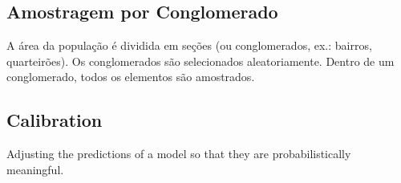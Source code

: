 \subsection{Amostragem por Conglomerado}
A área da população é dividida em seções (ou conglomerados, ex.: bairros, quarteirões). Os conglomerados são selecionados aleatoriamente. Dentro de um conglomerado, todos os elementos são amostrados.


\subsection{Calibration}
Adjusting the predictions of a model so that they are probabilistically meaningful.
